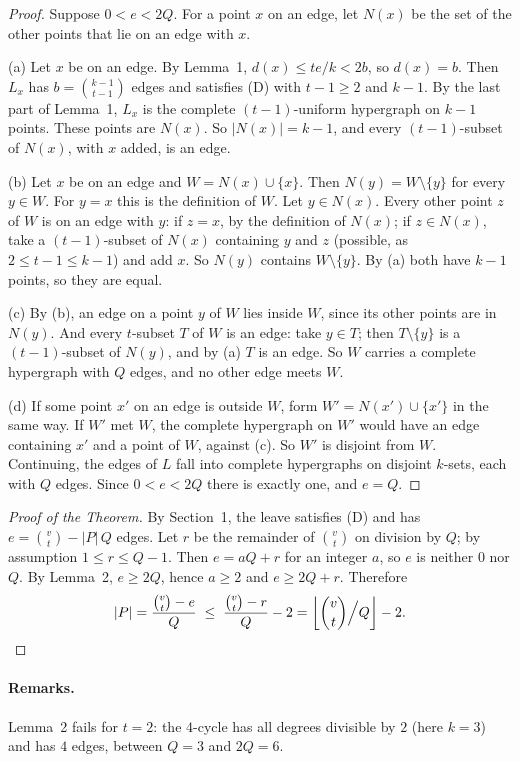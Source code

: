 \documentclass[11pt,a4paper]{article}
\newcommand{\abs}[1]{\lvert #1\rvert}
\begin{document}
\begin{proof}
Suppose $0<e<2Q$. For a point $x$ on an edge, let $N(x)$ be the set of the
other points that lie on an edge with $x$.

(a) Let $x$ be on an edge. By Lemma~1, $d(x)\le te/k<2b$, so $d(x)=b$. Then
$L_x$ has $b=\binom{k-1}{t-1}$ edges and satisfies (D) with $t-1\ge 2$ and
$k-1$. By the last part of Lemma~1, $L_x$ is the complete $(t-1)$-uniform
hypergraph on $k-1$ points. These points are $N(x)$. So $\abs{N(x)}=k-1$,
and every $(t-1)$-subset of $N(x)$, with $x$ added, is an edge.

(b) Let $x$ be on an edge and $W=N(x)\cup\{x\}$. Then
$N(y)=W\setminus\{y\}$ for every $y\in W$. For $y=x$ this is the definition
of $W$. Let $y\in N(x)$. Every other point $z$ of $W$ is on an edge with
$y$: if $z=x$, by the definition of $N(x)$; if $z\in N(x)$, take a
$(t-1)$-subset of $N(x)$ containing $y$ and $z$ (possible, as
$2\le t-1\le k-1$) and add $x$. So $N(y)$ contains $W\setminus\{y\}$. By (a)
both have $k-1$ points, so they are equal.

(c) By (b), an edge on a point $y$ of $W$ lies inside $W$, since its other
points are in $N(y)$. And every $t$-subset $T$ of $W$ is an edge: take
$y\in T$; then $T\setminus\{y\}$ is a $(t-1)$-subset of $N(y)$, and by (a)
$T$ is an edge. So $W$ carries a complete hypergraph with $Q$ edges, and no
other edge meets $W$.

(d) If some point $x'$ on an edge is outside $W$, form
$W'=N(x')\cup\{x'\}$ in the same way. If $W'$ met $W$, the complete
hypergraph on $W'$ would have an edge containing $x'$ and a point of $W$,
against (c). So $W'$ is disjoint from $W$. Continuing, the edges of $L$ fall
into complete hypergraphs on disjoint $k$-sets, each with $Q$ edges. Since
$0<e<2Q$ there is exactly one, and $e=Q$.
\end{proof}

\begin{proof}[Proof of the Theorem]
By Section~1, the leave satisfies (D) and has $e=\binom{v}{t}-\abs{P}\,Q$
edges. Let $r$ be the remainder of $\binom{v}{t}$ on division by $Q$; by
assumption $1\le r\le Q-1$. Then $e=aQ+r$ for an integer $a$, so $e$ is
neither $0$ nor $Q$. By Lemma~2, $e\ge 2Q$, hence $a\ge 2$ and
$e\ge 2Q+r$. Therefore
\[
\abs{P}=\frac{\binom{v}{t}-e}{Q}\;\le\;\frac{\binom{v}{t}-r}{Q}-2
=\left\lfloor \binom{v}{t}\Big/Q\right\rfloor-2 . \qedhere
\]
\end{proof}

\paragraph{Remarks.}
Lemma~2 fails for $t=2$: the $4$-cycle has all degrees divisible by $2$
(here $k=3$) and has $4$ edges, between $Q=3$ and $2Q=6$.
\end{document}
